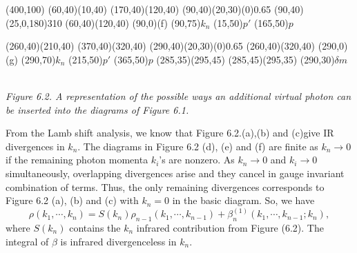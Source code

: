 \begin{center}
	\begin{axopicture}(400,100)
		\Line[arrow](60,40)(10,40)
		\Line[arrow](170,40)(120,40)
		\GOval(90,40)(20,30)(0){0.65}
		\PhotonArc(90,40)(25,0,180){3}{10}
		\Line(60,40)(120,40)
		\Text(90,0){(f)}
		\Text(90,75){$k_n$}
		\Text(15,50){$p'$} 	\Text(165,50){$p$}
		
		\Line[arrow](260,40)(210,40)
		\Line[arrow](370,40)(320,40)
		\GOval(290,40)(20,30)(0){0.65}
		\Line(260,40)(320,40)
		\Text(290,0){(g)}
		\Text(290,70){$k_n$}
		\Text(215,50){$p'$} 	\Text(365,50){$p$}
		\Line(285,35)(295,45)
		\Line(285,45)(295,35)
		\Text(290,30){$\delta m$}
	\end{axopicture}  
	\\{\sl Figure 6.2. A representation of the possible ways an additional virtual photon can be inserted into the diagrams of Figure 6.1.}                 
\end{center}
From the Lamb shift analysis, we know that Figure 6.2.(a),(b) and (c)give IR divergences in $k_n$. The diagrams in Figure 6.2 (d), (e) and (f) are finite as $k_n \rightarrow 0$ if the remaining photon momenta $k_i$'s are nonzero. As $k_n \rightarrow 0$ and $k_i \rightarrow 0$ simultaneously, overlapping divergences arise and they cancel in gauge invariant combination of terms. Thus, the only remaining divergences corresponds to Figure 6.2 (a), (b) and (c) with $k_n = 0$ in the basic diagram. So, we have
\begin{equation}
\rho(k_1,\cdots,k_n) = S(k_n)\rho_{n-1}(k_1,\cdots,k_{n-1})+\beta^{(1)}_n(k_1,\cdots,k_{n-1};k_n),
\end{equation}
where $S(k_n)$ contains the $k_n$ infrared contribution from Figure (6.2). The integral of $\beta$ is infrared divergenceless in $k_n$.

